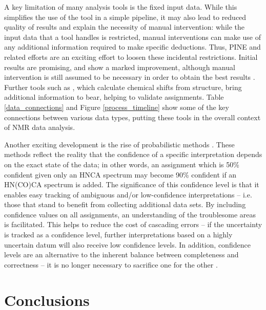 A key limitation of many analysis tools is the fixed input data.  While
this simplifies the use of the tool in a simple pipeline, it may also lead
to reduced quality of results and explain the necessity of manual intervention:  
while the input data that a tool handles is restricted, manual interventions can
make use of any additional information required to make specific deductions. 
Thus, PINE and related efforts  
are an exciting effort to loosen these incidental restrictions.  Initial 
results are promising, and show a marked improvement, although manual 
intervention is still assumed to be necessary in order to obtain the best 
results \cite{pine}.  Further tools such as \cite{shiftx2, cheshire}, 
which calculate chemical shifts from structure,  
bring additional information to bear, helping to validate assignments.
Table \ref{data_connections} and Figure \ref{process_timeline} show some
of the key connections between various data types, putting these tools in
the overall context of NMR data analysis.

Another exciting development is the rise of probabilistic methods 
\cite{saga, pine}.  These methods reflect the reality that the 
confidence of a specific interpretation depends on the exact state of the 
data; in other words, an assignment which is 50\% confident given only an 
HNCA spectrum may become 90\% confident if an HN(CO)CA spectrum is added.  
The significance of this confidence level is that it enables easy tracking 
of ambiguous and/or low-confidence interpretations -- i.e. those that stand 
to benefit from collecting additional data sets.  By including confidence 
values on all assignments, an understanding of the troublesome areas is 
facilitated.  This helps to reduce the cost of cascading errors -- if the 
uncertainty is tracked as a confidence level, further interpretations based 
on a highly uncertain datum will also receive low confidence levels.  In 
addition, confidence levels are an alternative to the inherent balance 
between completeness and correctness -- it is no longer necessary to 
sacrifice one for the other \cite{autoassign2001, pine}.


\section{Conclusions}

